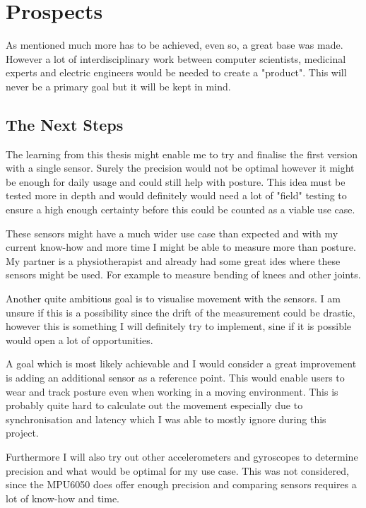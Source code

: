 \chapter*{Prospects}
\label{chap:Porspects}
\setcounter{section}{0}

As mentioned much more has to be achieved, even so, a great base was made. However a lot of interdisciplinary work between computer scientists, medicinal experts and electric engineers would be needed to create a "product". This will never be a primary goal but it will be kept in mind.

\section{The Next Steps}

The learning from this thesis might enable me to try and finalise the first version with a single sensor. Surely the precision would not be optimal however it might be enough for daily usage and could still help with posture.
This idea must be tested more in depth and would definitely would need a lot of "field" testing to ensure a high enough certainty before this could be counted as a viable use case. 

These sensors might have a much wider use case than expected and with my current know-how and more time I might be able to measure more than posture. My partner is a physiotherapist and already had some great ides where these sensors might be used. For example to measure bending of knees and other joints. 

Another quite ambitious goal is to visualise movement with the sensors. I am unsure if this is a possibility since the drift of the measurement could be drastic, however this is something I will definitely try to implement, sine if it is possible would open a lot of opportunities.

A goal which is most likely achievable and I would consider a great improvement is adding an additional sensor as a reference point. This would enable users to wear and track posture even when working in a moving environment. This is probably quite hard to calculate out the movement especially due to synchronisation and latency which I was able to mostly ignore during this project.

Furthermore I will also try out other accelerometers and gyroscopes to determine precision and what would be optimal for my use case. This was not considered, since the MPU6050 does offer enough precision and comparing sensors requires a lot of know-how and time.